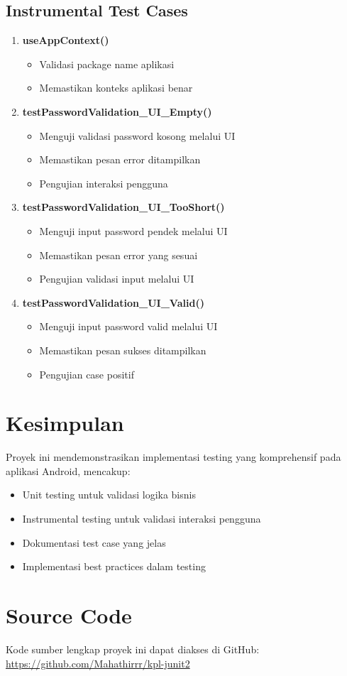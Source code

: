 \documentclass[12pt,a4paper]{article}
\begin{document}
\subsection{Instrumental Test Cases}
\begin{enumerate}
    \item \textbf{useAppContext()}
    \begin{itemize}
        \item Validasi package name aplikasi
        \item Memastikan konteks aplikasi benar
    \end{itemize}
    
    \item \textbf{testPasswordValidation\_UI\_Empty()}
    \begin{itemize}
        \item Menguji validasi password kosong melalui UI
        \item Memastikan pesan error ditampilkan
        \item Pengujian interaksi pengguna
    \end{itemize}
    
    \item \textbf{testPasswordValidation\_UI\_TooShort()}
    \begin{itemize}
        \item Menguji input password pendek melalui UI
        \item Memastikan pesan error yang sesuai
        \item Pengujian validasi input melalui UI
    \end{itemize}
    
    \item \textbf{testPasswordValidation\_UI\_Valid()}
    \begin{itemize}
        \item Menguji input password valid melalui UI
        \item Memastikan pesan sukses ditampilkan
        \item Pengujian case positif
    \end{itemize}
\end{enumerate}

\section{Kesimpulan}
Proyek ini mendemonstrasikan implementasi testing yang komprehensif pada aplikasi Android, mencakup:
\begin{itemize}
    \item Unit testing untuk validasi logika bisnis
    \item Instrumental testing untuk validasi interaksi pengguna
    \item Dokumentasi test case yang jelas
    \item Implementasi best practices dalam testing
\end{itemize}

\section{Source Code}
Kode sumber lengkap proyek ini dapat diakses di GitHub:
\url{https://github.com/Mahathirrr/kpl-junit2}
\end{document}
